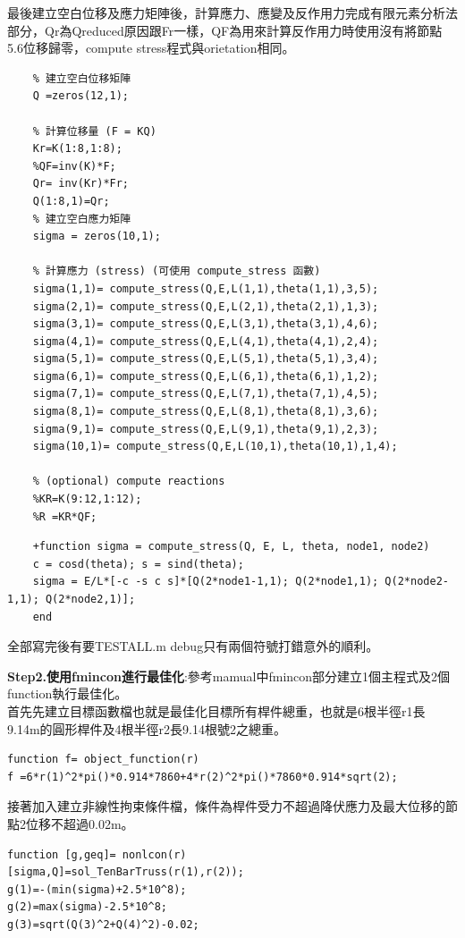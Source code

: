 \documentclass[12pt]{article}
\begin{document}
\begin{CJK}{UTF8}{bkai}
最後建立空白位移及應力矩陣後，計算應力、應變及反作用力完成有限元素分析法部分，Qr為Qreduced原因跟Fr一樣，QF為用來計算反作用力時使用沒有將節點5.6位移歸零，compute stress程式與orietation相同。

\begin{lstlisting}
	% 建立空白位移矩陣
    Q =zeros(12,1);
  
    % 計算位移量 (F = KQ)
    Kr=K(1:8,1:8);
    %QF=inv(K)*F;
    Qr= inv(Kr)*Fr;
    Q(1:8,1)=Qr;
    % 建立空白應力矩陣
    sigma = zeros(10,1);
  
    % 計算應力 (stress) (可使用 compute_stress 函數)
    sigma(1,1)= compute_stress(Q,E,L(1,1),theta(1,1),3,5);
    sigma(2,1)= compute_stress(Q,E,L(2,1),theta(2,1),1,3);
    sigma(3,1)= compute_stress(Q,E,L(3,1),theta(3,1),4,6);
    sigma(4,1)= compute_stress(Q,E,L(4,1),theta(4,1),2,4);
    sigma(5,1)= compute_stress(Q,E,L(5,1),theta(5,1),3,4);
    sigma(6,1)= compute_stress(Q,E,L(6,1),theta(6,1),1,2);
    sigma(7,1)= compute_stress(Q,E,L(7,1),theta(7,1),4,5);
    sigma(8,1)= compute_stress(Q,E,L(8,1),theta(8,1),3,6);
    sigma(9,1)= compute_stress(Q,E,L(9,1),theta(9,1),2,3);
    sigma(10,1)= compute_stress(Q,E,L(10,1),theta(10,1),1,4);

    % (optional) compute reactions
    %KR=K(9:12,1:12);
    %R =KR*QF;
\end{lstlisting}

\begin{lstlisting}
	+function sigma = compute_stress(Q, E, L, theta, node1, node2)
    c = cosd(theta); s = sind(theta);
    sigma = E/L*[-c -s c s]*[Q(2*node1-1,1); Q(2*node1,1); Q(2*node2-1,1); Q(2*node2,1)];
	end
\end{lstlisting}

全部寫完後有要TESTALL.m debug只有兩個符號打錯意外的順利。

\textbf{Step2.使用fmincon進行最佳化}:參考mamual中fmincon部分建立1個主程式及2個function執行最佳化。\\

首先先建立目標函數檔也就是最佳化目標所有桿件總重，也就是6根半徑r1長9.14m的圓形桿件及4根半徑r2長9.14根號2之總重。

\begin{lstlisting}
function f= object_function(r)
f =6*r(1)^2*pi()*0.914*7860+4*r(2)^2*pi()*7860*0.914*sqrt(2);
\end{lstlisting}

接著加入建立非線性拘束條件檔，條件為桿件受力不超過降伏應力及最大位移的節點2位移不超過0.02m。
\begin{lstlisting}
function [g,geq]= nonlcon(r)
[sigma,Q]=sol_TenBarTruss(r(1),r(2));
g(1)=-(min(sigma)+2.5*10^8);
g(2)=max(sigma)-2.5*10^8;
g(3)=sqrt(Q(3)^2+Q(4)^2)-0.02;


\end{lstlisting}
\end{CJK}
\end{document}
